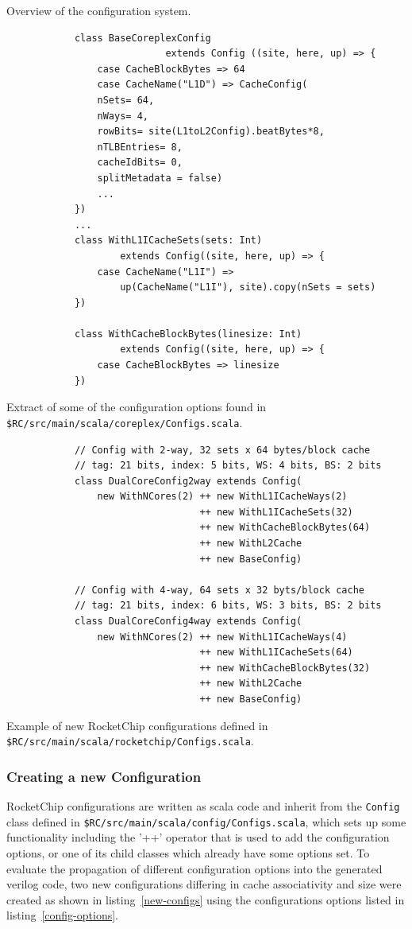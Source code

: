 \documentclass[journal,a4paper]{IEEEtran}
\begin{document}
\begin{table}
	\caption{Overview of the configuration system.}
	\begin{subtable}[b]{0.9\linewidth}
		\begin{verbatim}
			class BaseCoreplexConfig
							extends Config ((site, here, up) => {
				case CacheBlockBytes => 64
				case CacheName("L1D") => CacheConfig(
				nSets= 64,
				nWays= 4,
				rowBits= site(L1toL2Config).beatBytes*8,
				nTLBEntries= 8,
				cacheIdBits= 0,
				splitMetadata = false)
				...
			})
			...
			class WithL1ICacheSets(sets: Int)
					extends Config((site, here, up) => {
				case CacheName("L1I") =>
					up(CacheName("L1I"), site).copy(nSets = sets)
			})

			class WithCacheBlockBytes(linesize: Int)
					extends Config((site, here, up) => {
				case CacheBlockBytes => linesize
			})
		\end{verbatim}
		\caption{Extract of some of the configuration options found in \texttt{\$RC/src/main/scala/coreplex/Configs.scala}.}
		\label{config-options}
	\end{subtable}
	\begin{subtable}[b]{0.9\linewidth}
		\begin{verbatim}
			// Config with 2-way, 32 sets x 64 bytes/block cache
			// tag: 21 bits, index: 5 bits, WS: 4 bits, BS: 2 bits
			class DualCoreConfig2way extends Config(
				new WithNCores(2) ++ new WithL1ICacheWays(2)
				                  ++ new WithL1ICacheSets(32)
				                  ++ new WithCacheBlockBytes(64)
				                  ++ new WithL2Cache
				                  ++ new BaseConfig)

			// Config with 4-way, 64 sets x 32 byts/block cache
			// tag: 21 bits, index: 6 bits, WS: 3 bits, BS: 2 bits
			class DualCoreConfig4way extends Config(
				new WithNCores(2) ++ new WithL1ICacheWays(4)
				                  ++ new WithL1ICacheSets(64)
				                  ++ new WithCacheBlockBytes(32)
				                  ++ new WithL2Cache
				                  ++ new BaseConfig)
		\end{verbatim}
		\caption{Example of new RocketChip configurations defined in \texttt{\$RC/src/main/scala/rocketchip/Configs.scala}.}
		\label{new-configs}
	\end{subtable}
\end{table}
\subsubsection{Creating a new Configuration}
RocketChip configurations are written as scala code and inherit from the \texttt{Config} class defined in \texttt{\$RC/src/main/scala/config/Configs.scala}, which sets up some functionality including the '++' operator that is used to add the configuration options, or one of its child classes which already have some options set.
To evaluate the propagation of different configuration options into the generated verilog code, two new configurations differing in cache associativity and size were created as shown in listing~\ref{new-configs} using the configurations options listed in listing~\ref{config-options}.
\end{document}
